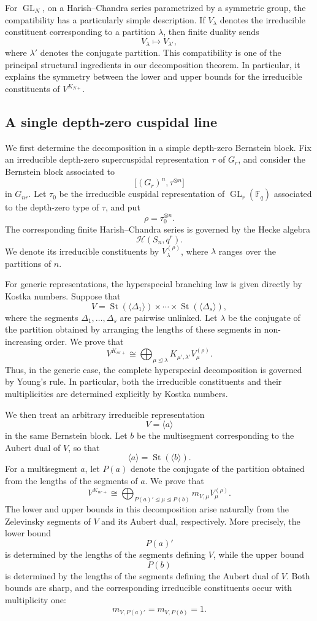 \documentclass[12pt]{article}
\theoremstyle{remark}
\begin{document}
For \(\operatorname{GL}_N\), on a Harish--Chandra series
parametrized by a symmetric group, the compatibility has a
particularly simple description. If \(V_\lambda\) denotes the
irreducible constituent corresponding to a partition
\(\lambda\), then finite duality sends
$$
V_\lambda\longmapsto V_{\lambda'},
$$
where \(\lambda'\) denotes the conjugate partition. This
compatibility is one of the principal structural ingredients in
our decomposition theorem. In particular, it explains the
symmetry between the lower and upper bounds for the irreducible
constituents of \(V^{K_{N+}}\).

\subsection*{A single depth-zero cuspidal line}

We first determine the decomposition in a simple depth-zero
Bernstein block. Fix an irreducible depth-zero supercuspidal
representation \(\tau\) of \(G_r\), and consider the Bernstein
block associated to
$$
\bigl[(G_r)^n,\tau^{\otimes n}\bigr]
$$
in \(G_{nr}\). Let \(\tau_0\) be the irreducible cuspidal
representation of \(\operatorname{GL}_r(\mathbb F_q)\)
associated to the depth-zero type of \(\tau\), and put
$$
\rho=\tau_0^{\otimes n}.
$$
The corresponding finite Harish--Chandra series is governed by
the Hecke algebra
$$
\mathcal{H}(S_n,q^r).
$$
We denote its irreducible constituents by
\(V_\lambda^{(\rho)}\), where \(\lambda\) ranges over the
partitions of \(n\).

For generic representations, the hyperspecial branching law is
given directly by Kostka numbers. Suppose that
$$
V=
\operatorname{St}(\langle\Delta_1\rangle)
\times\cdots\times
\operatorname{St}(\langle\Delta_s\rangle),
$$
where the segments \(\Delta_1,\ldots,\Delta_s\) are pairwise
unlinked. Let \(\lambda\) be the conjugate of the partition
obtained by arranging the lengths of these segments in
non-increasing order. We prove that
$$
V^{K_{nr+}}
\cong
\bigoplus_{\mu\unlhd\lambda}
K_{\mu',\lambda'}V_\mu^{(\rho)}.
$$
Thus, in the generic case, the complete hyperspecial
decomposition is governed by Young's rule. In particular, both
the irreducible constituents and their multiplicities are
determined explicitly by Kostka numbers.

We then treat an arbitrary irreducible representation
$$
V=\langle a\rangle
$$
in the same Bernstein block. Let \(b\) be the multisegment
corresponding to the Aubert dual of \(V\), so that
$$
\langle a\rangle
=
\operatorname{St}(\langle b\rangle).
$$
For a multisegment \(a\), let \(P(a)\) denote the conjugate of
the partition obtained from the lengths of the segments of
\(a\). We prove that
$$
V^{K_{nr+}}
\cong
\bigoplus_{P(a)'\unlhd\mu\unlhd P(b)}
m_{V,\mu}V_\mu^{(\rho)}.
$$
The lower and upper bounds in this decomposition arise naturally
from the Zelevinsky segments of \(V\) and its Aubert dual,
respectively. More precisely, the lower bound
$$
P(a)'
$$
is determined by the lengths of the segments defining \(V\),
while the upper bound
$$
P(b)
$$
is determined by the lengths of the segments defining the
Aubert dual of \(V\). Both bounds are sharp, and the
corresponding irreducible constituents occur with multiplicity
one:
$$
m_{V,P(a)'}=m_{V,P(b)}=1.
$$
\end{document}
